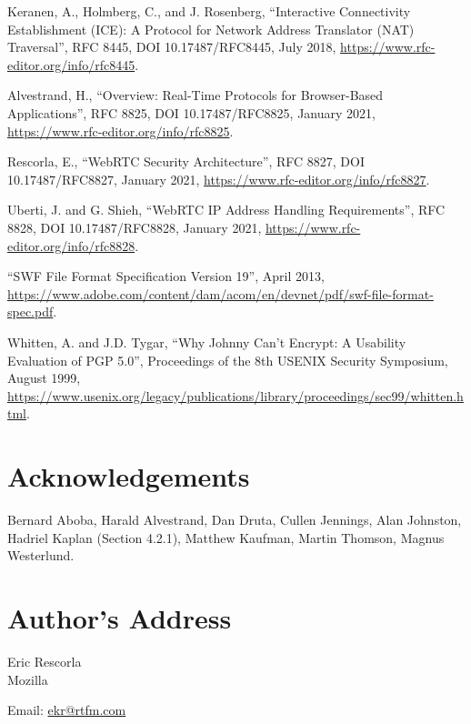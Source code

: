 \documentclass{article}
\begin{document}
\begin{description}[style=nextline, labelwidth=10em, leftmargin=10em]
\item[{[RFC8445]}] Keranen, A., Holmberg, C., and J. Rosenberg, ``Interactive
   Connectivity Establishment (ICE): A Protocol for Network
   Address Translator (NAT) Traversal'', RFC 8445,
   DOI 10.17487/RFC8445, July 2018,
   \url{https://www.rfc-editor.org/info/rfc8445}.

\item[{[RFC8825]}] Alvestrand, H., ``Overview: Real-Time Protocols for
   Browser-Based Applications'', RFC 8825,
   DOI 10.17487/RFC8825, January 2021,
   \url{https://www.rfc-editor.org/info/rfc8825}.

\item[{[RFC8827]}] Rescorla, E., ``WebRTC Security Architecture'', RFC 8827,
   DOI 10.17487/RFC8827, January 2021,
   \url{https://www.rfc-editor.org/info/rfc8827}.

\item[{[RFC8828]}] Uberti, J. and G. Shieh, ``WebRTC IP Address Handling
   Requirements'', RFC 8828, DOI 10.17487/RFC8828, January
   2021, \url{https://www.rfc-editor.org/info/rfc8828}.

\item[{[SWF]}] ``SWF File Format Specification Version 19'', April 2013,
   \url{https://www.adobe.com/content/dam/acom/en/devnet/pdf/swf-file-format-spec.pdf}.

\item[{[whitten-johnny]}] Whitten, A. and J.D. Tygar, ``Why Johnny Can't Encrypt: A
   Usability Evaluation of PGP 5.0'', Proceedings of the 8th
   USENIX Security Symposium, August 1999,
   \url{https://www.usenix.org/legacy/publications/library/proceedings/sec99/whitten.html}.
\end{description}

\section*{Acknowledgements}

Bernard Aboba, Harald Alvestrand, Dan Druta, Cullen Jennings, Alan
Johnston, Hadriel Kaplan (Section 4.2.1), Matthew Kaufman, Martin
Thomson, Magnus Westerlund.

\section*{Author's Address}

Eric Rescorla \\
Mozilla

Email: \href{mailto:ekr@rtfm.com}{ekr@rtfm.com}
\end{document}
